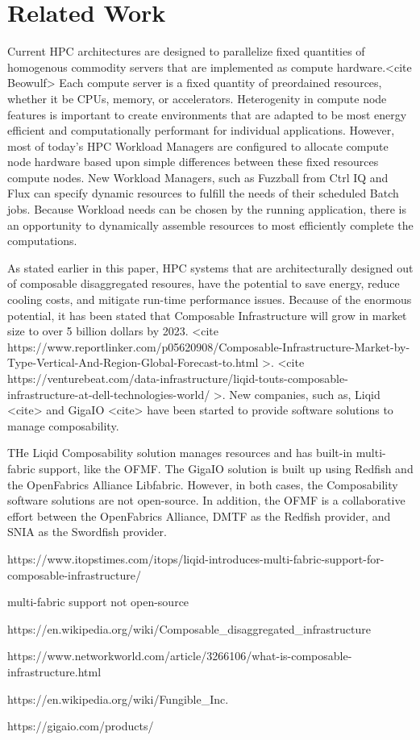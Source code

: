 \section{Related Work}
Current HPC architectures are designed to parallelize fixed quantities of homogenous commodity servers that are implemented as compute hardware.<cite Beowulf>  Each compute server is a fixed quantity of preordained resources, whether it be CPUs, memory, or accelerators.  Heterogenity in compute node features is important to create environments that are adapted to be most energy efficient and computationally performant for individual applications.  However, most of today's HPC Workload Managers are configured to allocate compute node hardware based upon simple differences between these fixed resources compute nodes.  New Workload Managers, such as Fuzzball from Ctrl IQ \cite{fuzzball} and Flux \cite{flux} can specify dynamic resources to fulfill the needs of their scheduled Batch jobs.  Because Workload needs can be chosen by the running application, there is an opportunity to dynamically assemble resources to most efficiently complete the computations.
 
As stated earlier in this paper, HPC systems that are architecturally designed out of composable disaggregated resoures, have the potential to save energy, reduce cooling costs, and mitigate run-time performance issues.  Because of the enormous potential, it has been stated that Composable Infrastructure will grow in market size to over 5 billion dollars by 2023. <cite https://www.reportlinker.com/p05620908/Composable-Infrastructure-Market-by-Type-Vertical-And-Region-Global-Forecast-to.html >. <cite https://venturebeat.com/data-infrastructure/liqid-touts-composable-infrastructure-at-dell-technologies-world/ >. New companies, such as, Liqid <cite> and GigaIO <cite> have been started to provide software solutions to manage composability.  

THe Liqid Composability solution manages resources and has built-in multi-fabric support, like the OFMF.  The GigaIO solution is built up using Redfish and the OpenFabrics Alliance Libfabric.  However, in both cases, the Composability software solutions are not open-source.  In addition, the OFMF is a collaborative effort between the OpenFabrics Alliance, DMTF as the Redfish provider, and SNIA as the Swordfish provider.

https://www.itopstimes.com/itops/liqid-introduces-multi-fabric-support-for-composable-infrastructure/

multi-fabric support not open-source

https://en.wikipedia.org/wiki/Composable_disaggregated_infrastructure

https://www.networkworld.com/article/3266106/what-is-composable-infrastructure.html

https://en.wikipedia.org/wiki/Fungible_Inc.

https://gigaio.com/products/





 

